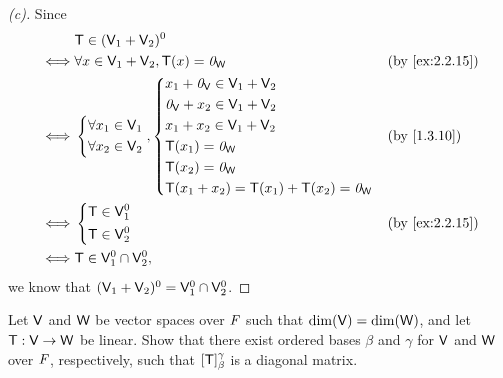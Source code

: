 \begin{proof}[(c)]
  Since
  \begin{align*}
         & \T \in (\V_1 + \V_2)^0                                                         \\
    \iff & \forall x \in \V_1 + \V_2, \T(x) = \zv_{\W}  &  & \text{(by \cref{ex:2.2.15})} \\
    \iff & \begin{dcases}
             \forall x_1 \in \V_1 \\
             \forall x_2 \in \V_2
           \end{dcases}, \begin{dcases}
                           x_1 + \zv_{\V} \in \V_1 + \V_2 \\
                           \zv_{\V} + x_2 \in \V_1 + \V_2 \\
                           x_1 + x_2 \in \V_1 + \V_2      \\
                           \T(x_1) = \zv_{\W}             \\
                           \T(x_2) = \zv_{\W}             \\
                           \T(x_1 + x_2) = \T(x_1) + \T(x_2) = \zv_{\W}
                         \end{dcases} &  & \text{(by \cref{1.3.10})}                      \\
    \iff & \begin{dcases}
             \T \in \V_1^0 \\
             \T \in \V_2^0
           \end{dcases}                             &  & \text{(by \cref{ex:2.2.15})}     \\
    \iff & \T \in \V_1^0 \cap \V_2^0,
  \end{align*}
  we know that \((\mathsf{V}_1 + \mathsf{V}_2)^0 = \mathsf{V}_1^0 \cap \mathsf{V}_2^0\).
\end{proof}

\begin{ex}\label{ex:2.2.16}
  Let \(\mathsf{V}\) and \(\mathsf{W}\) be vector spaces over \(\mathit{F}\) such that \(\dim(\mathsf{V}) = \dim(\mathsf{W})\), and let \(\mathsf{T} : \mathsf{V} \to \mathsf{W}\) be linear.
  Show that there exist ordered bases \(\beta\) and \(\gamma\) for \(\mathsf{V}\) and \(\mathsf{W}\) over \(\mathit{F}\), respectively, such that \([\mathsf{T}]_{\beta}^{\gamma}\) is a diagonal matrix.
\end{ex}

